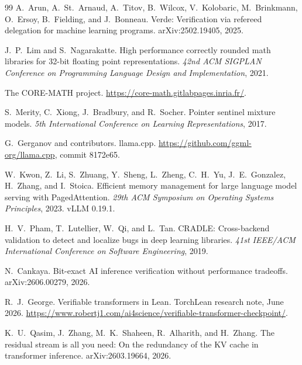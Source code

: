 \documentclass[11pt]{article}
\theoremstyle{plain}
\theoremstyle{definition}
\begin{document}
\begin{thebibliography}{99}
A.~Arun, A.~St.~Arnaud, A.~Titov, B.~Wilcox, V.~Kolobaric, M.~Brinkmann,
  O.~Ersoy, B.~Fielding, and J.~Bonneau.
\newblock Verde: Verification via refereed delegation for machine learning
  programs.
\newblock arXiv:2502.19405, 2025.

J.~P.~Lim and S.~Nagarakatte.
\newblock High performance correctly rounded math libraries for 32-bit floating
  point representations.
\newblock \emph{42nd ACM SIGPLAN Conference on Programming Language Design and
  Implementation}, 2021.

The CORE-MATH project.
\newblock \url{https://core-math.gitlabpages.inria.fr/}.

S.~Merity, C.~Xiong, J.~Bradbury, and R.~Socher.
\newblock Pointer sentinel mixture models.
\newblock \emph{5th International Conference on Learning Representations}, 2017.

G.~Gerganov and contributors.
\newblock llama.cpp.
\newblock \url{https://github.com/ggml-org/llama.cpp}, commit 8172e65.

W.~Kwon, Z.~Li, S.~Zhuang, Y.~Sheng, L.~Zheng, C.~H.~Yu, J.~E.~Gonzalez,
  H.~Zhang, and I.~Stoica.
\newblock Efficient memory management for large language model serving with
  PagedAttention.
\newblock \emph{29th ACM Symposium on Operating Systems Principles}, 2023.
\newblock vLLM 0.19.1.

H.~V.~Pham, T.~Lutellier, W.~Qi, and L.~Tan.
\newblock CRADLE: Cross-backend validation to detect and localize bugs in deep
  learning libraries.
\newblock \emph{41st IEEE/ACM International Conference on Software
  Engineering}, 2019.

N.~Cankaya.
\newblock Bit-exact AI inference verification without performance tradeoffs.
\newblock arXiv:2606.00279, 2026.

R.~J.~George.
\newblock Verifiable transformers in Lean.
\newblock TorchLean research note, June 2026.
\newblock \url{https://www.robertj1.com/ai4science/verifiable-transformer-checkpoint/}.

K.~U.~Qasim, J.~Zhang, M.~K.~Shaheen, R.~Alharith, and H.~Zhang.
\newblock The residual stream is all you need: On the redundancy of the KV cache
  in transformer inference.
\newblock arXiv:2603.19664, 2026.

\end{thebibliography}
\end{document}
